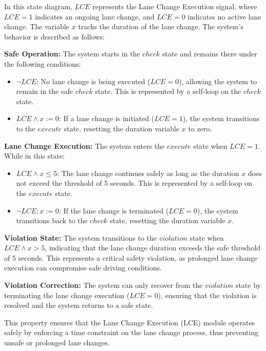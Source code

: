 In this state diagram, $LCE$ represents the Lane Change Execution signal, where $LCE=1$ indicates an ongoing lane change, and $LCE=0$ indicates no active lane change. The variable $x$ tracks the duration of the lane change. The system's behavior is described as follows:

\textbf{Safe Operation:} The system starts in the $check$ state and remains there under the following conditions:
\begin{itemize}
    \item $\neg LCE$: No lane change is being executed ($LCE=0$), allowing the system to remain in the safe $check$ state. This is represented by a self-loop on the $check$ state.
    \item $LCE \land x:=0$: If a lane change is initiated ($LCE=1$), the system transitions to the $execute$ state, resetting the duration variable $x$ to zero.
\end{itemize}

\textbf{Lane Change Execution:} The system enters the $execute$ state when $LCE=1$. While in this state:
\begin{itemize}
    \item $LCE \land x \leq 5$: The lane change continues safely as long as the duration $x$ does not exceed the threshold of 5 seconds. This is represented by a self-loop on the $execute$ state.
    \item $\neg LCE; x:=0$: If the lane change is terminated ($LCE=0$), the system transitions back to the $check$ state, resetting the duration variable $x$.
\end{itemize}

\textbf{Violation State:} The system transitions to the $violation$ state when $LCE \land x > 5$, indicating that the lane change duration exceeds the safe threshold of 5 seconds. This represents a critical safety violation, as prolonged lane change execution can compromise safe driving conditions.

\textbf{Violation Correction:} The system can only recover from the $violation$ state by terminating the lane change execution ($LCE=0$), ensuring that the violation is resolved and the system returns to a safe state.

This property ensures that the Lane Change Execution (LCE) module operates safely by enforcing a time constraint on the lane change process, thus preventing unsafe or prolonged lane changes.
